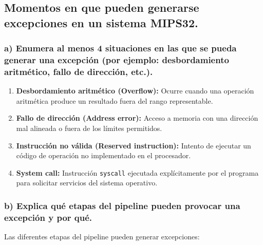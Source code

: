 \documentclass[12pt]{article}
\begin{document}
	\subsection{Momentos en que pueden generarse excepciones en un sistema MIPS32.}
	
	\subsubsection{a) Enumera al menos 4 situaciones en las que se pueda generar una excepción (por ejemplo: desbordamiento aritmético, fallo de dirección, etc.).}
	
	\begin{enumerate}
		\item \textbf{Desbordamiento aritmético (Overflow):} Ocurre cuando una operación aritmética produce un resultado fuera del rango representable.
		
		\item \textbf{Fallo de dirección (Address error):} Acceso a memoria con una dirección mal alineada o fuera de los límites permitidos.
		
		\item \textbf{Instrucción no válida (Reserved instruction):} Intento de ejecutar un código de operación no implementado en el procesador.
		
		\item \textbf{System call:} Instrucción \texttt{syscall} ejecutada explícitamente por el programa para solicitar servicios del sistema operativo.
		
	\end{enumerate}
	
	\subsubsection{b) Explica qué etapas del pipeline pueden provocar una excepción y por qué.}
	
	Las diferentes etapas del pipeline pueden generar excepciones:
	
\end{document}
